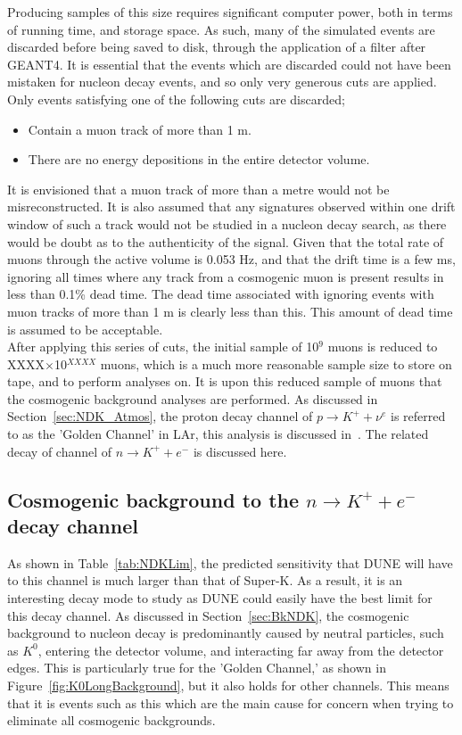 Producing samples of this size requires significant computer power, both in terms of running time, and storage space. As such, many of the simulated events are discarded before being saved to disk, through the application of a filter after GEANT4. It is essential that the events which are discarded could not have been mistaken for nucleon decay events, and so only very generous cuts are applied. Only events satisfying one of the following cuts are discarded;
\begin{itemize}
\item Contain a muon track of more than 1 m.
\item There are no energy depositions in the entire detector volume.
\end{itemize}
It is envisioned that a muon track of more than a metre would not be misreconstructed. It is also assumed that any signatures observed within one drift window of such a track would not be studied in a nucleon decay search, as there would be doubt as to the authenticity of the signal. Given that the total rate of muons through the active volume is 0.053 Hz, and that the drift time is a few ms, ignoring all times where any track from a cosmogenic muon is present results in less than 0.1\% dead time. The dead time associated with ignoring events with muon tracks of more than 1 m is clearly less than this. This amount of dead time is assumed to be acceptable. \\

After applying this series of cuts, the initial sample of 10$^9$ muons is reduced to XXXX$\times$10$^{XXXX}$ muons, which is a much more reasonable sample size to store on tape, and to perform analyses on. It is upon this reduced sample of muons that the cosmogenic background analyses are performed. As discussed in Section~\ref{sec:NDK_Atmos}, the proton decay channel of $p \rightarrow K^{+} + \nu^{e}$ is referred to as the 'Golden Channel' in LAr, this analysis is discussed in~\citep{NDKTFNote}. The related decay of channel of $n \rightarrow K^{+} + e^{-}$ is discussed here. \\

\subsection{Cosmogenic background to the $n \rightarrow K^{+} + e^{-}$ decay channel} \label{sec:NDKCosmBk}
As shown in Table~\ref{tab:NDKLim}, the predicted sensitivity that DUNE will have to this channel is much larger than that of Super-K. As a result, it is an interesting decay mode to study as DUNE could easily have the best limit for this decay channel. As discussed in Section~\ref{sec:BkNDK}, the cosmogenic background to nucleon decay is predominantly caused by neutral particles, such as $K^0$, entering the detector volume, and interacting far away from the detector edges. This is particularly true for the 'Golden Channel,' as shown in Figure~\ref{fig:K0LongBackground}, but it also holds for other channels. This means that it is events such as this which are the main cause for concern when trying to eliminate all cosmogenic backgrounds. \\


